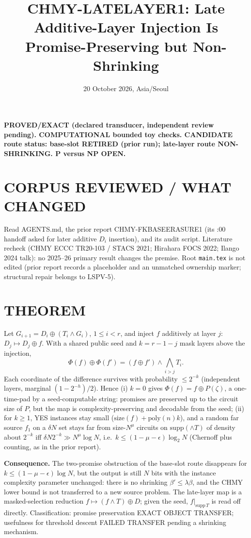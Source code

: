 \documentclass[11pt]{article}
\title{CHMY-LATELAYER1: Late Additive-Layer Injection Is Promise-Preserving but Non-Shrinking}
\date{20 October 2026, Asia/Seoul}
\begin{document}
\maketitle
\noindent\textbf{PROVED/EXACT (declared transducer, independent review pending). COMPUTATIONAL bounded toy checks. CANDIDATE route status: base-slot RETIRED (prior run); late-layer route NON-SHRINKING. P versus NP OPEN.}

\section*{CORPUS REVIEWED / WHAT CHANGED}
Read AGENTS.md, the prior report CHMY-FKBASEERASURE1 (its :00 handoff asked for later additive $D_i$ insertion), and its audit script. Literature recheck (CHMY ECCC TR20-103 / STACS 2021; Hirahara FOCS 2022; Ilango 2024 talk): no 2025--26 primary result changes the premise. Root \texttt{main.tex} is not edited (prior report records a placeholder and an unmatched ownership marker; structural repair belongs to LSPV-5).

\section*{THEOREM}
Let $G_{i+1}=D_i\oplus(T_i\wedge G_i)$, $1\le i<r$, and inject $f$ additively at layer $j$: $D_j\mapsto D_j\oplus f$. With a shared public seed and $k=r-1-j$ mask layers above the injection,
\[
\Phi(f)\oplus\Phi(f')=(f\oplus f')\wedge\bigwedge_{i>j}T_i .
\]
Each coordinate of the difference survives with probability $\le 2^{-k}$ (independent layers, marginal $(1-2^{-h})/2$). Hence (i) $k=0$ gives $\Phi(f)=f\oplus P(\zeta)$, a one-time-pad by a seed-computable string: promises are preserved up to the circuit size of $P$, but the map is complexity-preserving and decodable from the seed; (ii) for $k\ge1$, YES instances stay small ($\mathrm{size}(f)+\mathrm{poly}(n)k$), and a random far source $f_1$ on a $\delta N$ set stays far from size-$N^\mu$ circuits on $\mathrm{supp}(\wedge T)$ of density about $2^{-k}$ iff $\delta N2^{-k}\gg N^\mu\log N$, i.e.\ $k\le(1-\mu-\epsilon)\log_2N$ (Chernoff plus counting, as in the prior report).

\textbf{Consequence.} The two-promise obstruction of the base-slot route disappears for $k\le(1-\mu-\epsilon)\log N$, but the output is still $N$ bits with the instance complexity parameter unchanged: there is no shrinking $\beta'\le\lambda\beta$, and the CHMY lower bound is not transferred to a new source problem. The late-layer map is a masked-selection reduction $f\mapsto(f\wedge T)\oplus D$; given the seed, $f|_{\mathrm{supp}\,T}$ is read off directly. Classification: promise preservation EXACT OBJECT TRANSFER; usefulness for threshold descent FAILED TRANSFER pending a shrinking mechanism.
\end{document}
